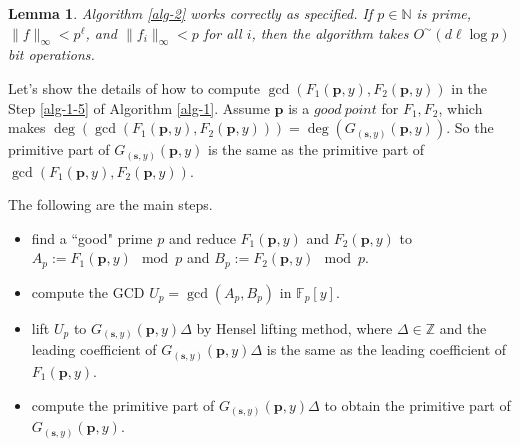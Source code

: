 \documentclass[final,20pt]{elsarticle}
\newtheorem{lemma}[theorem]{Lemma}
\def\N{{\mathbb N}}
\def\Z{{\mathbb Z}}
\def\F{{\mathbb{F}}}
\begin{document}
\begin{lemma}\cite[The.15.18]{GaGer13}\label{lm-12}
Algorithm \ref{alg-2} works correctly as specified.
If $p\in \N$ is prime, $\|f \|_{\infty} < p^\ell$, and $\|f_i\|_{\infty} < p$ for all $i$, then the algorithm takes $O^\sim(d\ell \log p)$ bit operations.
\end{lemma}

Let's show the details of how to compute $\gcd(F_1(\mathbf{p},y),F_2(\mathbf{p},y))$  in the Step \ref{alg-1-5} of Algorithm \ref{alg-1}. Assume $\mathbf{p}$ is a $good\ point$ for $F_1,F_2$, which makes $\deg(\gcd(F_1(\mathbf{p},y),F_2(\mathbf{p},y)))=\deg (G_{(\mathbf{s},y)}(\mathbf{p},y))$. So the primitive part of $G_{(\mathbf{s},y)}(\mathbf{p},y)$  is the same as the primitive part of $\gcd(F_1(\mathbf{p},y),F_2(\mathbf{p},y))$.

The following are the main steps.
%
\begin{itemize}
\item find a ``good" prime $p$ and  reduce $F_1(\mathbf{p},y)$ and $F_2(\mathbf{p},y)$ to $A_p:=F_1(\mathbf{p},y) \mod p$ and $B_p:=F_2(\mathbf{p},y) \mod p$.
\item compute the GCD $U_p=\gcd(A_p,B_p)$ in $\F_p[y]$.

\item  lift $U_p$ to $G_{(\mathbf{s},y)}(\mathbf{p},y)\Delta$ by Hensel lifting method, where $\Delta\in\Z$ and the leading coefficient of  $G_{(\mathbf{s},y)}(\mathbf{p},y)\Delta$ is the same as the leading coefficient of  $F_1(\mathbf{p},y)$.
%
\item  compute the primitive part of $G_{(\mathbf{s},y)}(\mathbf{p},y)\Delta$ to obtain the primitive part of $G_{(\mathbf{s},y)}(\mathbf{p},y)$.
%
\end{itemize}
\end{document}
